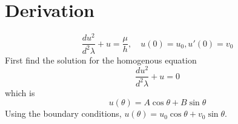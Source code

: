 % 

\section{Derivation}
\label{sec:derive}
\begin{equation}
	\frac{d u^{2}}{d^{2} \lambda} + u = \frac{\mu}{h}, \quad u(0) = u_{0}, u'(0) = v_{0}
\label{eq:forced-oscillator}
\end{equation}
First find the solution for the homogenous equation
\begin{equation}
	\frac{d u^{2}}{d^{2} \lambda} + u =0
\label{eq:unforced-oscillator}
\end{equation}
which is
\begin{equation}
	u(\theta) = A \cos \theta + B \sin \theta
\label{eq:homogenous}
\end{equation}
Using the boundary conditions, $u(\theta) = u_{0} \cos \theta + v_{0} \sin \theta$.

\endinput  %
